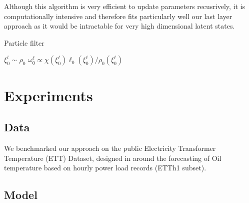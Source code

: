 \documentclass[journal]{IEEEtran}
\begin{document}
Although this algorithm is very efficient to update parameters recusrively, it is computationally intensive and therefore fits particularly well our last layer approach as it would be intractable for very high dimensional latent states.

\begin{algorithm}
	\caption{Particle filter}
	\label{alg:particle_filter}
	$\xi_0^l \sim \rho_0$\;
	$\omega_0^{\ell} \propto \chi\left(\xi^{\ell}_0\right)\ell_0 \left(\xi^{\ell}_0\right)/ \rho_0 \left(\xi^{\ell}_0\right)$\;
\end{algorithm}

\section{Experiments}
\label{sec:exp}
\subsection{Data}
\label{sub:data}
We benchmarked our approach on the public Electricity Transformer Temperature (ETT) Dataset, designed in \cite{Zhou2021Informer} around the forecasting of Oil temperature based on hourly power load records (ETTh1 subset).

\subsection{Model}%
\label{sub:models}
\end{document}
